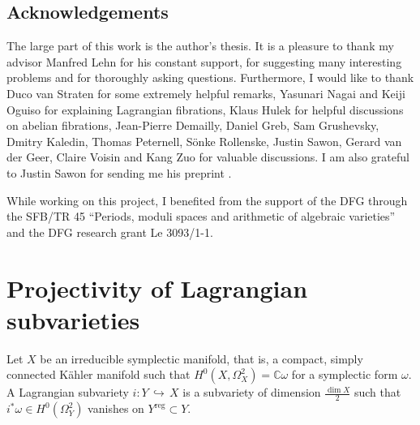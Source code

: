 \documentclass[a4paper,11pt,final]{amsart}
\theoremstyle{plain}
\theoremstyle{definition}
\numberwithin{equation}{section}
\theoremstyle{remark}
\begin{document}
\subsection*{Acknowledgements} The large part of this work is the author's thesis. It is a pleasure to thank my advisor Manfred Lehn for his constant support, for suggesting many interesting problems and for thoroughly asking questions. Furthermore, I would like to thank Duco van Straten for some extremely helpful remarks, Yasunari Nagai and Keiji Oguiso for explaining Lagrangian fibrations, Klaus Hulek for helpful discussions on abelian fibrations, Jean-Pierre Demailly, Daniel Greb, Sam Grushevsky, Dmitry Kaledin, Thomas Peternell, S\"onke Rollenske, Justin Sawon, Gerard van der Geer, Claire Voisin and Kang Zuo for valuable discussions. I am also grateful to Justin Sawon for sending me his preprint \cite{Sa15}.

While working on this project, I benefited from the support of the DFG through the SFB/TR 45 ``Periods, moduli spaces and arithmetic of algebraic varieties'' and the DFG research grant Le 3093/1-1.

\section[Lagrangian subvarieties]{Projectivity of Lagrangian subvarieties}\label{section lagrange}
Let $X$ be an irreducible symplectic manifold, that is, a compact, simply connected K\"ahler manifold such that $H^0(X,\Omega_X^2) = {{\mathbb C}} \omega$ for a symplectic form $\omega$. A Lagrangian subvariety $i:Y {{\, \hookrightarrow\,}} X$ is a subvariety of dimension $\frac{\dim X}2$ such that $i^*\omega \in H^0(\Omega_Y^2)$ vanishes on $Y^{{\operatorname{reg}}}\subset Y$.
\end{document}
